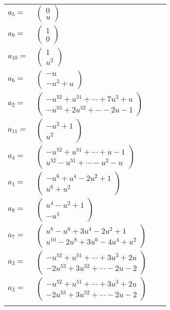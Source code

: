 \documentclass[1p]{elsarticle_modified}
\theoremstyle{definition}
\begin{document}
\begin{tabular}{m{7pt} m{180pt} m{7pt} m{180pt} }
\flushright $a_{5}=$&$\begin{pmatrix}0\\u\end{pmatrix}$ \\
\flushright $a_{9}=$&$\begin{pmatrix}1\\0\end{pmatrix}$ \\
\flushright $a_{10}=$&$\begin{pmatrix}1\\u^2\end{pmatrix}$ \\
\flushright $a_{6}=$&$\begin{pmatrix}- u\\- u^3+u\end{pmatrix}$ \\
\flushright $a_{2}=$&$\begin{pmatrix}- u^{52}+u^{51}+\cdots+7 u^3+u\\- u^{53}+2 u^{52}+\cdots-2 u-1\end{pmatrix}$ \\
\flushright $a_{11}=$&$\begin{pmatrix}- u^2+1\\u^2\end{pmatrix}$ \\
\flushright $a_{4}=$&$\begin{pmatrix}- u^{52}+u^{51}+\cdots+u-1\\u^{52}- u^{51}+\cdots- u^2- u\end{pmatrix}$ \\
\flushright $a_{1}=$&$\begin{pmatrix}- u^6+u^4-2 u^2+1\\u^6+u^2\end{pmatrix}$ \\
\flushright $a_{8}=$&$\begin{pmatrix}u^4- u^2+1\\- u^4\end{pmatrix}$ \\
\flushright $a_{7}=$&$\begin{pmatrix}u^8- u^6+3 u^4-2 u^2+1\\u^{10}-2 u^8+3 u^6-4 u^4+u^2\end{pmatrix}$ \\
\flushright $a_{3}=$&$\begin{pmatrix}- u^{52}+u^{51}+\cdots+3 u^3+2 u\\-2 u^{53}+3 u^{52}+\cdots-2 u-2\end{pmatrix}$\\ \flushright $a_{3}=$&$\begin{pmatrix}- u^{52}+u^{51}+\cdots+3 u^3+2 u\\-2 u^{53}+3 u^{52}+\cdots-2 u-2\end{pmatrix}$\\&\end{tabular}
\end{document}
